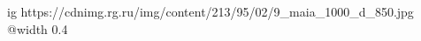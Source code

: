  
 
 
 
 

\ifcmt
  ig https://cdnimg.rg.ru/img/content/213/95/02/9_maia_1000_d_850.jpg
  @width 0.4
\fi


